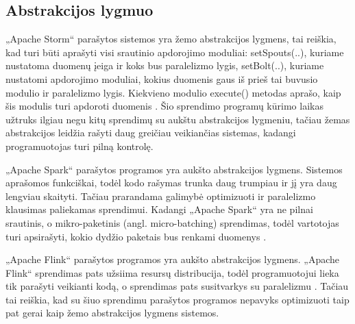\documentclass{VUMIFPSbakalaurinis}
\begin{document}
\subsection{Abstrakcijos lygmuo}

„Apache Storm“ parašytos sistemos yra žemo abstrakcijos lygmens, tai reiškia, kad turi būti aprašyti visi srautinio apdorojimo moduliai: 
setSpouts(..), kuriame nustatoma duomenų įeiga ir koks bus paralelizmo lygis, setBolt(..), kuriame nustatomi apdorojimo moduliai, kokius duomenis gaus iš prieš tai buvusio modulio ir paralelizmo lygis. Kiekvieno modulio execute() metodas aprašo, kaip šis modulis turi apdoroti duomenis \cite{tutpoint}. Šio sprendimo programų kūrimo laikas užtruks ilgiau negu kitų sprendimų su aukštu abstrakcijos lygmeniu, tačiau žemas abstrakcijos leidžia rašyti daug greičiau veikiančias sistemas, kadangi programuotojas turi pilną kontrolę. \par

„Apache Spark“ parašytos programos yra aukšto abstrakcijos lygmens. Sistemos aprašomos funkciškai, todėl kodo rašymas trunka daug trumpiau ir jį yra daug lengviau skaityti. Tačiau prarandama galimybė optimizuoti ir paralelizmo klausimas paliekamas sprendimui. Kadangi „Apache Spark“ yra ne pilnai srautinis, o mikro-paketinis (angl. micro-batching) sprendimas, todėl vartotojas turi apsirašyti, kokio dydžio paketais bus renkami duomenys \cite{shoro2015big}. \par

„Apache Flink“ parašytos programos yra aukšto abstrakcijos lygmens. „Apache Flink“ sprendimas pats užsiima resursų distribucija, todėl programuotojui lieka tik parašyti veikianti kodą, o sprendimas pats susitvarkys su paralelizmu \cite{flinkdoc}. Tačiau tai reiškia, kad su šiuo sprendimu parašytos programos nepavyks optimizuoti taip pat gerai kaip žemo abstrakcijos lygmens sistemos. \par
\end{document}
